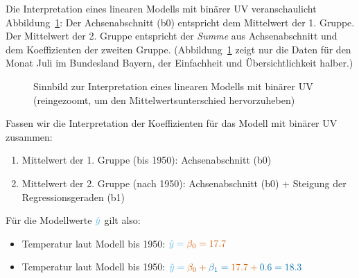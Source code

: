 \documentclass[
  letterpaper,
]{scrbook}
\providecommand{\tightlist}{%
  \setlength{\itemsep}{0pt}\setlength{\parskip}{0pt}}\usepackage{longtable,booktabs,array}
\theoremstyle{definition}
\theoremstyle{definition}
\theoremstyle{definition}
\theoremstyle{remark}
\begin{document}
Die Interpretation eines linearen Modells mit binärer UV veranschaulicht
Abbildung~\ref{fig-binvar}: Der Achsenabschnitt (b0) entspricht dem
Mittelwert der 1. Gruppe. Der Mittelwert der 2. Gruppe entspricht der
\emph{Summe} aus Achsenabschnitt und dem Koeffizienten der zweiten
Gruppe. (Abbildung~\ref{fig-binvar} zeigt nur die Daten für den Monat
Juli im Bundesland Bayern, der Einfachheit und Übersichtlichkeit
halber.)

\begin{figure}


\caption{\label{fig-binvar}Sinnbild zur Interpretation eines linearen
Modells mit binärer UV (reingezoomt, um den Mittelwertsunterschied
hervorzuheben)}

\end{figure}%

Fassen wir die Interpretation der Koeffizienten für das Modell mit
binärer UV zusammen:

\begin{enumerate}
\def\labelenumi{\arabic{enumi}.}
\tightlist
\item
  Mittelwert der 1. Gruppe (bis 1950): {Achsenabschnitt (b0)}
\item
  Mittelwert der 2. Gruppe (nach 1950): {Achsenabschnitt (b0)} +
  {Steigung der Regressionsgeraden (b1)}
\end{enumerate}

Für die Modellwerte \(\color{modelcol}{\hat{y}}\) gilt also:

\begin{itemize}
\item
  Temperatur laut Modell bis 1950:
  \(\color{modelcol}{\hat{y}} = \color{beta0col}{\beta_0} = 17.7\)
\item
  Temperatur laut Modell bis 1950:
  \(\color{modelcol}{\hat{y}} = \color{beta0col}{\beta_0} +  \color{beta1col}{\beta_1}= \color{beta0col}{17.7} + \color{beta1col}{0.6} = 18.3\)
\end{itemize}
\end{document}
